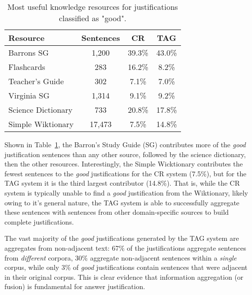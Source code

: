 %
%
\begin{table}[t]
\caption{{ Most useful knowledge resources for justifications classified as "good".}}
\small
\begin{center}
\begin{tabular}{lccc}
\hline
\multicolumn{1}{l}{Resource} & \multicolumn{1}{c}{Sentences} &\multicolumn{1}{c}{CR} & \multicolumn{1}{c}{TAG}  \\
\cline{2-3}
\hline
Barrons SG 			& 1,200		&	39.3\%		& 43.0\%	\\
Flashcards			& 283		&	16.2\%		& 8.2\%	\\
Teacher's Guide		& 302		&	7.1\%		& 7.0\%	\\
Virginia SG			& 1,314		&	9.1\%		& 9.2\%	\\
Science Dictionary	& 733		&	20.8\%		& 17.8\%	\\
Simple Wiktionary	& 17,473		&	7.5\%		& 14.8\%	\\

\end{tabular}

\label{tab:justificationknowledgeresources}
\end{center}
\end{table}

{} Shown in Table~\ref{tab:justificationknowledgeresources}, the Barron's Study Guide (SG) contributes more of the \emph{good} justification sentences than any other source, followed by the science dictionary, then the other resources.  Interestingly, the Simple Wicktionary contributes the fewest sentences to the \emph{good} justifications for the CR system (7.5\%), but for the TAG system it is the third largest contributor (14.8\%).  That is, while the CR system is typically unable to find a \emph{good} justification from the Wiktionary, likely owing to it's general nature, the TAG system is able to successfully aggregate these sentences with sentences from other domain-specific sources to build complete justifications.

The vast majority of the \emph{good} justifications generated by the TAG system are aggregates from non-adjacent text: 67\% of the justifications aggregate sentences from \emph{different} corpora, 30\% aggregate non-adjacent sentences within a \emph{single} corpus, while only 3\% of \emph{good} justifications contain sentences that were adjacent in their original corpus. 
This is clear evidence that information aggregation (or fusion) is fundamental for answer justification.


